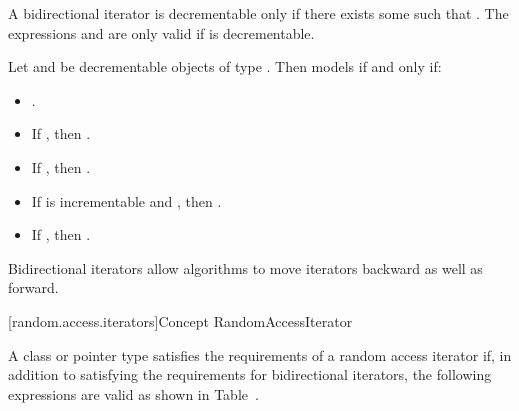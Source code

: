 
\begin{addedblock}
\pnum
A bidirectional iterator  is decrementable only if there exists some  such that
. The expressions  and  are only valid if  is
decrementable.

\pnum
Let  and  be decrementable objects of type . Then  models
 if and only if:

\begin{itemize}
\item {}.
\item If , then .
\item If , then .
\item If  is incrementable and , then
      .
\item If , then .
\end{itemize}
\end{addedblock}

\begin{removedblock}
\pnum
\enternote
Bidirectional iterators allow algorithms to move iterators backward as well as forward.
\exitnote
\end{removedblock}

{\color{newclr}
[random.access.iterators]{Concept RandomAccessIterator}
}

\begin{removedblock}
\pnum
A class or pointer type
satisfies the requirements of a random access iterator if,
in addition to satisfying the requirements for bidirectional iterators,
the following expressions are valid as shown in Table~.
\end{removedblock}

